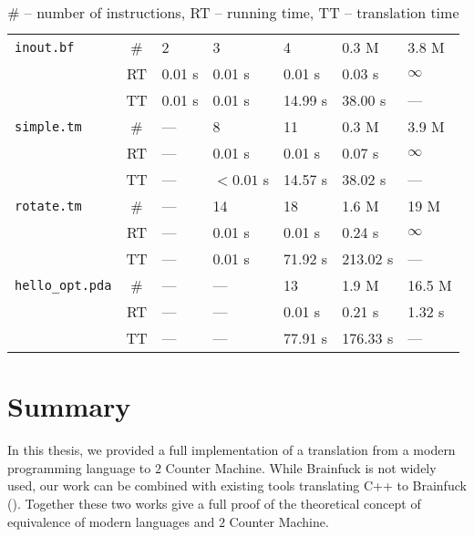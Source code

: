 \documentclass[english,shortabstract,mgr]{iithesis}
\begin{document}
\begin{table}[]
\begin{center}
\begin{tabular}{
  L{2.6cm}c|R{1.7cm}R{1.7cm}R{1.7cm}R{1.7cm}R{1.7cm}
}
\hline
\texttt{inout.bf} & \# & 2 & 3 & 4 & 0.3 M & 3.8 M\\
 & {\footnotesize{RT}} & 0.01 s & 0.01 s & 0.01 s & 0.03 s & $\infty$ \\
 & {\footnotesize{TT}} & 0.01 s & 0.01 s & 14.99 s & 38.00 s & --- \\
\hline
\texttt{simple.tm} & \# & --- & 8 & 11 & 0.3 M & 3.9 M\\
 & {\footnotesize{RT}} & --- & 0.01 s & 0.01 s & 0.07 s & $\infty$ \\
 & {\footnotesize{TT}} & --- & $<0.01$ s & 14.57 s & 38.02 s & --- \\
\hline
\texttt{rotate.tm} & \# & --- & 14 & 18 & 1.6 M & 19 M\\
 & {\footnotesize{RT}} & --- & 0.01 s & 0.01 s & 0.24 s & $\infty$ \\
 & {\footnotesize{TT}} & --- & 0.01 s & 71.92 s & 213.02 s & --- \\
\hline
\texttt{hello\_opt.pda} & \# & --- & --- & 13 & 1.9 M & 16.5 M\\
 & {\footnotesize{RT}} & --- & --- & 0.01 s & 0.21 s & 1.32 s \\
 & {\footnotesize{TT}} & --- & --- & 77.91 s & 176.33 s & --- \\
\end{tabular}
\centering
\caption{
\# -- number of instructions, RT -- running time, TT -- translation time
}
\label{t:summary}
\end{center}
\end{table}


\chapter{Summary}

In this thesis, we provided a full implementation of a translation
from a modern programming language to $2$ Counter Machine. 
While Brainfuck is not widely used, our work can be combined with 
existing tools translating C++
to Brainfuck (\cite{in-person}). Together these two works give a full
proof of the theoretical concept of equivalence of modern languages and $2$ Counter
Machine.
\end{document}
